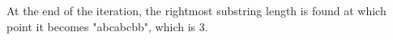 \documentclass[preview]{standalone}
\begin{document}
At the end of the iteration, the rightmost substring length is found at which point it becomes "abcabcbb", which is 3.\\
\end{document}
